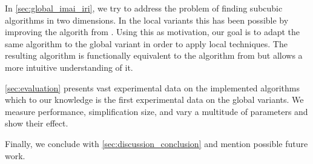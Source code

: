 In \cref{sec:global_imai_iri}, we try to address the problem of finding subcubic algorithms in two dimensions. In the local variants this has been possible by improving the algorith from \citeauthor{computational_geometric_methods_for_polygonal_approximations_of_a_curve}. Using this as motivation, our goal is to adapt the same algorithm to the global variant in order to apply local techniques. The resulting algorithm is functionally equivalent to the algorithm from \citeauthor{global_curve_simplification} but allows a more intuitive understanding of it.

\cref{sec:evaluation} presents vast experimental data on the implemented algorithms which to our knowledge is the first experimental data on the global variants. We measure performance, simplification size, and vary a multitude of parameters and show their effect.

Finally, we conclude with \cref{sec:discussion_conclusion} and mention possible future work.
 

